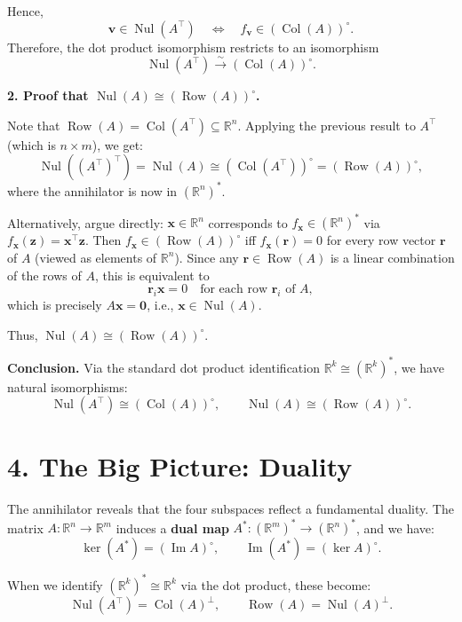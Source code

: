 \documentclass[11pt]{article}
\newcommand{\nul}{\operatorname{Nul}}
\newcommand{\col}{\operatorname{Col}}
\newcommand{\row}{\operatorname{Row}}
\begin{document}
Hence,
\[
\mathbf{v} \in \nul(A^\top) \quad \Longleftrightarrow \quad f_{\mathbf{v}} \in (\col(A))^\circ.
\]
Therefore, the dot product isomorphism restricts to an isomorphism
\[
\nul(A^\top) \xrightarrow{\sim} (\col(A))^\circ.
\]

\medskip

\noindent\textbf{2. Proof that $\nul(A) \cong (\row(A))^\circ$.}

Note that $\row(A) = \col(A^\top) \subseteq \mathbb{R}^n$. Applying the previous result to $A^\top$ (which is $n \times m$), we get:
\[
\nul((A^\top)^\top) = \nul(A) \cong (\col(A^\top))^\circ = (\row(A))^\circ,
\]
where the annihilator is now in $(\mathbb{R}^n)^*$.

Alternatively, argue directly:  
$\mathbf{x} \in \mathbb{R}^n$ corresponds to $f_{\mathbf{x}} \in (\mathbb{R}^n)^*$ via $f_{\mathbf{x}}(\mathbf{z}) = \mathbf{x}^\top \mathbf{z}$.  
Then $f_{\mathbf{x}} \in (\row(A))^\circ$ iff $f_{\mathbf{x}}(\mathbf{r}) = 0$ for every row vector $\mathbf{r}$ of $A$ (viewed as elements of $\mathbb{R}^n$).  
Since any $\mathbf{r} \in \row(A)$ is a linear combination of the rows of $A$, this is equivalent to
\[
\mathbf{r}_i \mathbf{x} = 0 \quad \text{for each row } \mathbf{r}_i \text{ of } A,
\]
which is precisely $A\mathbf{x} = \mathbf{0}$, i.e., $\mathbf{x} \in \nul(A)$.

Thus, $\nul(A) \cong (\row(A))^\circ$.

\medskip

\noindent\textbf{Conclusion.}  
Via the standard dot product identification $\mathbb{R}^k \cong (\mathbb{R}^k)^*$, we have natural isomorphisms:
\[
\boxed{\nul(A^\top) \cong (\col(A))^\circ}, \qquad
\boxed{\nul(A) \cong (\row(A))^\circ}.
\]





\section*{4. The Big Picture: Duality}

The annihilator reveals that the four subspaces reflect a fundamental duality.  
The matrix $ A: \mathbb{R}^n \to \mathbb{R}^m $ induces a \textbf{dual map} $ A^*: (\mathbb{R}^m)^* \to (\mathbb{R}^n)^* $, and we have:
\[
\ker(A^*) = (\operatorname{Im} A)^\circ, \qquad \operatorname{Im}(A^*) = (\ker A)^\circ.
\]

When we identify $ (\mathbb{R}^k)^* \cong \mathbb{R}^k $ via the dot product, these become:
\[
\operatorname{Nul}(A^\top) = \operatorname{Col}(A)^\perp, \qquad \operatorname{Row}(A) = \operatorname{Nul}(A)^\perp.
\]
\end{document}
